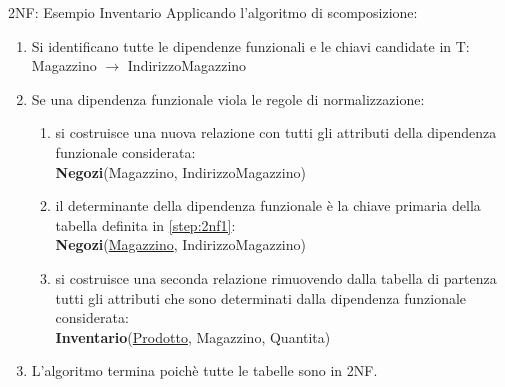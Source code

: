 \begin{frame}{2NF: Esempio Inventario}
Applicando l'algoritmo di scomposizione:
{\scriptsize \begin{minipage}{0.8\textwidth}
    \begin{enumerate}[<+->]
        \item Si identificano tutte le dipendenze funzionali e le chiavi candidate in T:
        \\Magazzino $ \rightarrow $ IndirizzoMagazzino
        \item Se una dipendenza funzionale viola le regole di normalizzazione:\label{step:2nf}
        \begin{minipage}{0.8\textwidth}
        \begin{enumerate}[a]
            \item si costruisce una nuova relazione con tutti gli attributi della dipendenza funzionale considerata\label{step:2nf1}:
            \\\textbf{Negozi}(Magazzino, IndirizzoMagazzino)
            \item il determinante della dipendenza funzionale \`e la chiave primaria della tabella definita in \ref{step:2nf1}:
            \\\textbf{Negozi}(\underline{Magazzino}, IndirizzoMagazzino)
            \item si costruisce una seconda relazione rimuovendo dalla tabella di partenza tutti gli attributi che sono determinati dalla dipendenza funzionale considerata:
            \\\textbf{Inventario}(\underline{Prodotto}, Magazzino, Quantita)
        \end{enumerate}
        \end{minipage}
        \item L'algoritmo termina poich\`e tutte le tabelle sono in 2NF.
    \end{enumerate}
\end{minipage}}
\end{frame}
